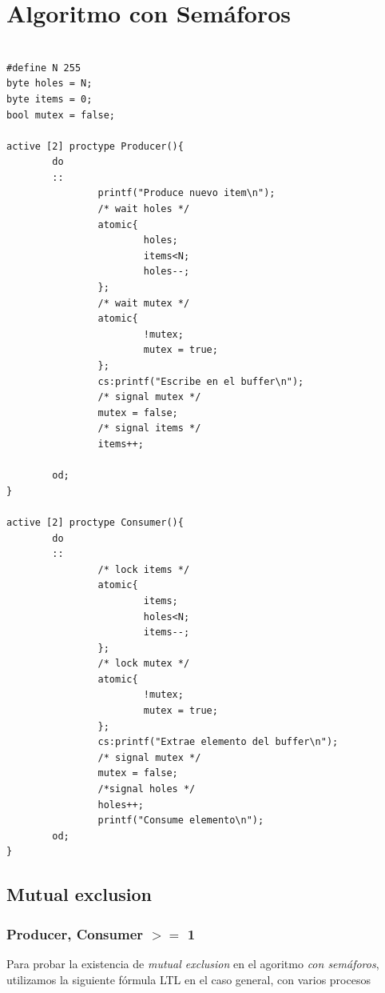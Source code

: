 \documentclass[a4paper,12pt]{article}
\begin{document}
\newpage
\section{Algoritmo con Semáforos}

\begin{lstlisting}[frame=single]  % Start your code-block

#define N 255
byte holes = N;
byte items = 0;
bool mutex = false;

active [2] proctype Producer(){
        do
        ::
                printf("Produce nuevo item\n");
                /* wait holes */
                atomic{
                        holes;
                        items<N;
                        holes--;
                };
                /* wait mutex */
                atomic{
                        !mutex;
                        mutex = true;
                };
                cs:printf("Escribe en el buffer\n");
                /* signal mutex */
                mutex = false;
                /* signal items */
                items++;

        od;
}

active [2] proctype Consumer(){
        do
        ::
                /* lock items */
                atomic{
                        items;
                        holes<N;
                        items--;
                };
                /* lock mutex */
                atomic{
                        !mutex;
                        mutex = true;
                };
                cs:printf("Extrae elemento del buffer\n");
                /* signal mutex */
                mutex = false;
                /*signal holes */
                holes++;
                printf("Consume elemento\n");
        od;
}
\end{lstlisting}

\subsection{Mutual exclusion}

\subsubsection{Producer, Consumer $>=$ 1}
Para probar la existencia de \textit{mutual exclusion} en el agoritmo \textit{con semáforos}, utilizamos la siguiente fórmula LTL en el caso general, con varios procesos
\end{document}
